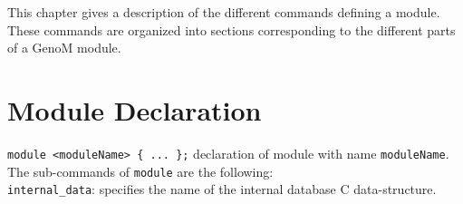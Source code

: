 %
%
%
%
%
%

This chapter gives a description of the different commands defining
a {\GenoM} module. These commands are organized into sections
corresponding to the different parts of a GenoM module.

\section{Module Declaration}
\label{sec|declaration}

\noindent
{\tt module <moduleName> \{ ... \};} declaration of module with name
{\tt moduleName}. \\

\noindent
The sub-commands of {\tt module} are the following:\\

\noindent
{\tt internal\_data}: specifies the name of the internal database
C data-structure.\\

